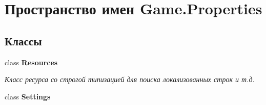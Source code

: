 \hypertarget{namespace_game_1_1_properties}{}\section{Пространство имен Game.\+Properties}
\label{namespace_game_1_1_properties}
\subsection*{Классы}
\begin{DoxyCompactItemize}
\item 
class {\bfseries Resources}
\begin{DoxyCompactList}\small\item\em Класс ресурса со строгой типизацией для поиска локализованных строк и т.\+д. \end{DoxyCompactList}\item 
class {\bfseries Settings}
\end{DoxyCompactItemize}
